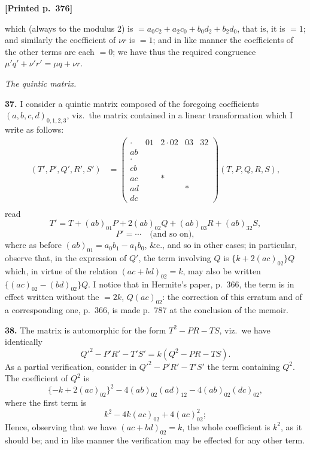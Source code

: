 \documentclass[11pt]{article}
\begin{document}
\medskip
\noindent\textbf{[Printed p.~376]}\hfill

\medskip
which (always to the modulus 2) is $=a_{0}c_{2}+a_{2}c_{0}+b_{0}d_{2}+b_{2}d_{0}$, that is, it is $=1$; and similarly the coefficient of $\nu r$ is $=1$; and in like manner the coefficients of the other terms are each $=0$; we have thus the required congruence $\mu' q'+\nu' r'=\mu q+\nu r$.

\medskip
\begin{center}\textit{The quintic matrix.}\end{center}

\noindent\textbf{37.} I consider a quintic matrix composed of the foregoing coefficients $(a,b,c,d)_{0,1,2,3}$, viz.\ the matrix contained in a linear transformation which I write as follows:
\[
\begin{array}{rl}
(T',P',Q',R',S')&=\begin{pmatrix}
\cdot & 01 & 2{\cdot}02 & 03 & 32\\
ab & & & & \\
\cdot & & & & \\
cb & & & & \\
ac & & {*} & & \\
ad & & & {*} & \\
dc & & & &
\end{pmatrix}(T,P,Q,R,S),\\[6pt]
\end{array}
\]
read
\[
T'=T+(ab)_{01}P+2(ab)_{02}Q+(ab)_{03}R+(ab)_{32}S,
\]
\[
P'=\cdots\quad\text{(and so on)},
\]
where as before $(ab)_{01}=a_{0}b_{1}-a_{1}b_{0}$, \&c., and so in other cases; in particular, observe that, in the expression of $Q'$, the term involving $Q$ is $\{k+2(ac)_{02}\}Q$ which, in virtue of the relation $(ac+bd)_{02}=k$, may also be written $\{(ac)_{02}-(bd)_{02}\}Q$. I notice that in Hermite's paper, p.~366, the term is in effect written without the $=2k$, $Q(ac)_{02}$: the correction of this erratum and of a corresponding one, p.~366, is made p.~787 at the conclusion of the memoir.

\medskip
\noindent\textbf{38.} The matrix is automorphic for the form $T^{2}-PR-TS$, viz.\ we have identically
\[
Q'^{2}-P'R'-T'S'=k(Q^{2}-PR-TS).
\]
As a partial verification, consider in $Q'^{2}-P'R'-T'S'$ the term containing $Q^{2}$. The coefficient of $Q^{2}$ is
\[
\{-k+2(ac)_{02}\}^{2}-4(ab)_{02}(ad)_{12}-4(ab)_{02}(dc)_{02},
\]
where the first term is
\[
k^{2}-4k(ac)_{02}+4(ac)_{02}^{2};
\]
Hence, observing that we have $(ac+bd)_{02}=k$, the whole coefficient is $k^{2}$, as it should be; and in like manner the verification may be effected for any other term.
\end{document}
